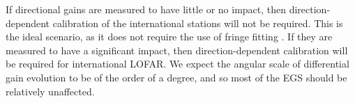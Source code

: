 \pg
If directional gains are measured to have little or no impact, then direction-dependent calibration of the international stations will not be required. This is the ideal scenario, as it does not require the use of fringe fitting . If they are measured to have a significant impact, then direction-dependent calibration will be required for international LOFAR. We expect the angular scale of differential gain evolution to be of the order of a degree, and so most of the EGS should be relatively unaffected.
%

%
%
%
%
